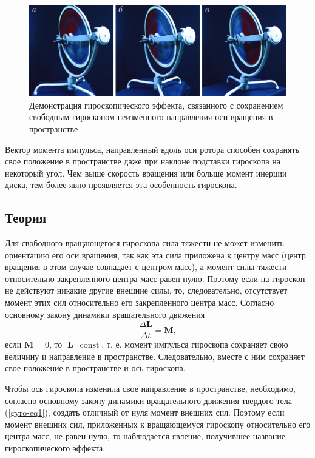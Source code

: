 \documentclass[All.tex]{subfiles}
\begin{document}
		\begin{figure}[H]
		\centering 		
		\includegraphics[width=0.9\linewidth]{gyro-2.png}		
		\caption{Демонстрация гироскопического эффекта, связанного с сохранением свободным гироскопом неизменного направления оси вращения в пространстве}
		\label{gyro-2}	
	\end{figure}

Вектор момента импульса, направленный вдоль оси ротора способен сохранять свое положение в пространстве даже при наклоне подставки гироскопа на некоторый угол.
Чем выше скорость вращения или больше момент инерции диска, тем более явно проявляется эта особенность гироскопа.

	\subsection*{\textcolor{PineGreen}{Теория}}
	
	Для свободного вращающегося гироскопа сила тяжести не может изменить ориентацию его оси вращения, так как эта сила приложена к центру масс (центр вращения в этом случае совпадает с центром масс), а момент силы тяжести относительно закрепленного центра масс равен нулю.
	Поэтому если на гироскоп не действуют никакие другие внешние силы, то, следовательно, отсутствует момент этих сил относительно его закрепленного центра масс.
	Согласно основному закону динамики вращательного движения
\begin{equation}\label{gyro-eq1}
	\frac{\Delta \textbf{L}}{\Delta t} = \textbf{M},
	\end{equation} 
	если $ \textbf{M}=0 $, то $ \textbf{L} = \text{const} $, т. е. момент импульса гироскопа сохраняет свою величину и направление в пространстве.
	Следовательно, вместе с ним сохраняет свое положение в пространстве и ось гироскопа.
		
	Чтобы ось гироскопа изменила свое направление в пространстве, необходимо, согласно основному закону динамики вращательного движения твердого тела (\ref{gyro-eq1}), создать отличный от нуля момент внешних сил.
	Поэтому если момент внешних сил, приложенных к вращающемуся гироскопу относительно его центра масс, не равен нулю, то наблюдается явление, получившее название гироскопического эффекта.
	
\end{document}
